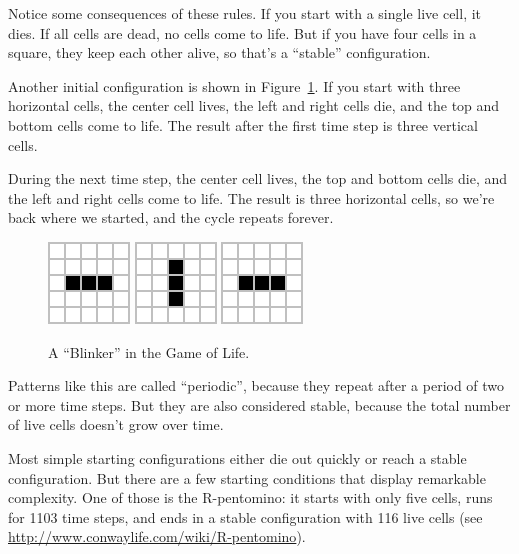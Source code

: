 
Notice some consequences of these rules.
If you start with a single live cell, it dies.
If all cells are dead, no cells come to life.
But if you have four cells in a square, they keep each other alive, so that's a ``stable'' configuration.

Another initial configuration is shown in Figure~\ref{fig:blinker}.
If you start with three horizontal cells, the center cell lives, the left and right cells die, and the top and bottom cells come to life.
The result after the first time step is three vertical cells.

During the next time step, the center cell lives, the top and bottom cells die, and the left and right cells come to life.
The result is three horizontal cells, so we're back where we started, and the cycle repeats forever.

\begin{figure}[!ht]
\begin{center}
\includegraphics{figs/blinker-0.png}
\raisebox{38pt}{~$\longrightarrow$~}
\includegraphics{figs/blinker-1.png}
\raisebox{38pt}{~$\longrightarrow$~}
\includegraphics{figs/blinker-0.png}
\raisebox{38pt}{~$\longrightarrow$~ \ldots}
\caption{A ``Blinker'' in the Game of Life.}
\label{fig:blinker}
\end{center}
\end{figure}

Patterns like this are called ``periodic'', because they repeat after a period of two or more time steps.
But they are also considered stable, because the total number of live cells doesn't grow over time.

Most simple starting configurations either die out quickly or reach a stable configuration.
But there are a few starting conditions that display remarkable complexity.
One of those is the R-pentomino: it starts with only five cells, runs for 1103 time steps, and ends in a stable configuration with 116 live cells (see \url{http://www.conwaylife.com/wiki/R-pentomino}).

